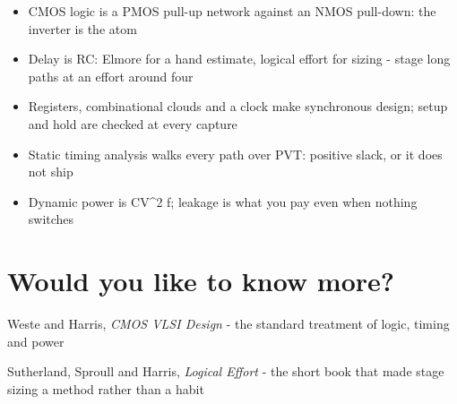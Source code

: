 \begin{itemize}
\tightlist
\item
  CMOS logic is a PMOS pull-up network against an NMOS pull-down: the
  inverter is the atom
\item
  Delay is RC: Elmore for a hand estimate, logical effort for sizing -
  stage long paths at an effort around four
\item
  Registers, combinational clouds and a clock make synchronous design;
  setup and hold are checked at every capture
\item
  Static timing analysis walks every path over PVT: positive slack, or
  it does not ship
\item
  Dynamic power is CV\^{}2 f; leakage is what you pay even when nothing
  switches
\end{itemize}

\section{Would you like to know
more?}\label{would-you-like-to-know-more}

Weste and Harris, \emph{CMOS VLSI Design} - the standard treatment of
logic, timing and power

Sutherland, Sproull and Harris, \emph{Logical Effort} - the short book
that made stage sizing a method rather than a habit

\label{refs}
\begin{CSLReferences}{0}{0}
\CSLLeftMargin{{[}1{]} }%

\end{CSLReferences}
